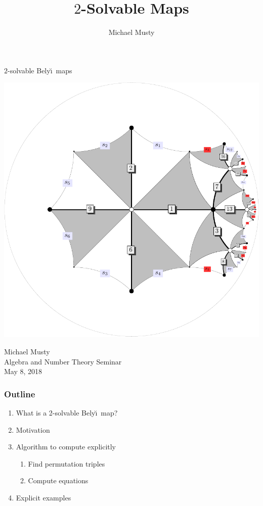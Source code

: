 \documentclass[xcolor=dvipsnames]{beamer}
\title{$2$-Solvable \Belyi Maps}
\author{Michael Musty}
\date{}
\theoremstyle{plain}
\newcommand{\Belyi}{Bely\u{\i}}
\begin{document}
  \begin{frame}[plain]
    \begin{center}{
      \Huge\color{SeaGreen}
      $2$-solvable
      \Belyi\ maps
    }
    \end{center}
    \begin{center}
      \includegraphics[scale = 0.3]{16T8-g3.pdf}
    \end{center}
    \begin{center}
      Michael Musty\\
      Algebra and Number Theory Seminar\\
      May 8, 2018
    \end{center}
  \end{frame}
  \begin{frame}[plain]
    \frametitle{Outline}
    \begin{enumerate}
      \item
        What is a 2-solvable \Belyi\ map?
      \item
        Motivation
      \item
        Algorithm to compute explicitly
        \begin{enumerate}
          \item
            Find permutation triples
          \item
            Compute equations
        \end{enumerate}
      \item
        Explicit examples
    \end{enumerate}
  \end{frame}
\end{document}
